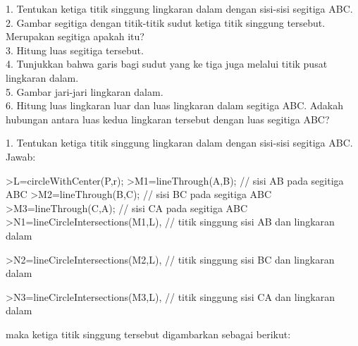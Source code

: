 \documentclass{article}
\begin{document}
\begin{eulernotebook}
\begin{eulercomment}
1. Tentukan ketiga titik singgung lingkaran dalam dengan sisi-sisi
segitiga ABC.\\
2. Gambar segitiga dengan titik-titik sudut ketiga titik singgung
tersebut. Merupakan segitiga apakah itu?\\
3. Hitung luas segitiga tersebut.\\
4. Tunjukkan bahwa garis bagi sudut yang ke tiga juga melalui titik
pusat lingkaran dalam.\\
5. Gambar jari-jari lingkaran dalam.\\
6. Hitung luas lingkaran luar dan luas lingkaran dalam segitiga ABC.
Adakah hubungan antara luas kedua lingkaran tersebut dengan luas
segitiga ABC?\\
\end{eulercomment}
\begin{eulercomment}
1. Tentukan ketiga titik singgung lingkaran dalam dengan sisi-sisi
segitiga ABC.\\
Jawab:
\end{eulercomment}
\begin{eulerprompt}
>L=circleWithCenter(P,r);
>M1=lineThrough(A,B); // sisi AB pada segitiga ABC
>M2=lineThrough(B,C); // sisi BC pada segitiga ABC
>M3=lineThrough(C,A); // sisi CA pada segitiga ABC
>N1=lineCircleIntersections(M1,L), // titik singgung sisi AB dan lingkaran dalam
\end{eulerprompt}
\begin{euleroutput}
  [0.5,  0.5]
\end{euleroutput}
\begin{eulerprompt}
>N2=lineCircleIntersections(M2,L), // titik singgung sisi BC dan lingkaran dalam
\end{eulerprompt}
\begin{euleroutput}
  [0.632456,  1.31623]
\end{euleroutput}
\begin{eulerprompt}
>N3=lineCircleIntersections(M3,L), // titik singgung sisi CA dan lingkaran dalam
\end{eulerprompt}
\begin{euleroutput}
  [1.31623,  0.632456]
\end{euleroutput}
\begin{eulercomment}
maka ketiga titik singgung tersebut digambarkan sebagai berikut:
\end{eulercomment}

\end{eulernotebook}
\end{document}
